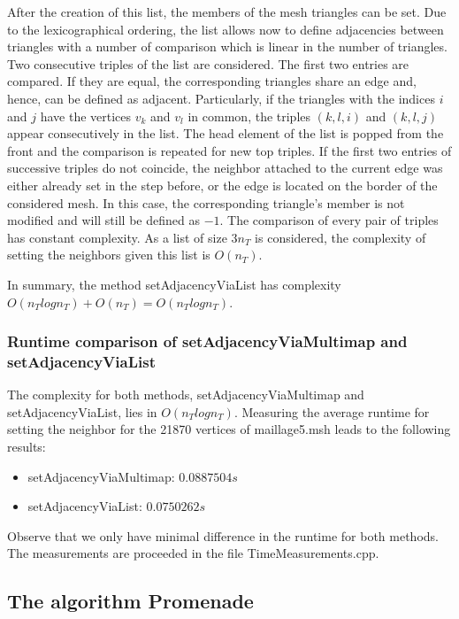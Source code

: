 \documentclass[10pt]{article}
\begin{document}
After the creation of this list, the members of the mesh triangles can be set. Due to the lexicographical ordering, the list allows now to define adjacencies between triangles with a number of comparison which is linear in the number of triangles. Two consecutive triples of the list are considered. The first two entries are compared. If they are equal, the corresponding triangles share an edge and, hence, can be defined as adjacent. Particularly, if the triangles with the indices $i$ and $j$ have the vertices $v_k$ and $v_l$ in common, the triples $({k},{l},i)$ and $({k},{l},j)$ appear consecutively in the list. The head element of the list is popped from the front and the comparison is repeated for new top triples. If the first two entries of successive triples do not coincide, the neighbor attached to the current edge was either already set in the step before, or the edge is located on the border of the considered mesh. In this case, the corresponding triangle's member is not modified and will still be defined as $-1$. The comparison of every pair of triples has constant complexity. As a list of size $3 n_T$ is considered, the complexity of setting the neighbors given this list is $O(n_T)$.

In summary, the method {\ttfamily setAdjacencyViaList} has complexity $O(n_Tlogn_T) + O(n_T) = O(n_Tlogn_T)$.

\subsubsection{Runtime comparison of setAdjacencyViaMultimap and setAdjacencyViaList}

The complexity for both methods, {\ttfamily setAdjacencyViaMultimap} and {\ttfamily setAdjacencyViaList}, lies in $O(n_Tlogn_T)$. Measuring the average runtime for setting the neighbor for the 21870 vertices of maillage5.msh leads to the following results: 

\begin{itemize}
	\item {\ttfamily setAdjacencyViaMultimap}: $ 0.0887504 s$
	\item {\ttfamily setAdjacencyViaList}: $ 0.0750262 s $
\end{itemize}

Observe that we only have minimal difference in the runtime for both methods. The measurements are proceeded in the file TimeMeasurements.cpp.


\subsection{The algorithm Promenade} \label{promenade}
\end{document}
